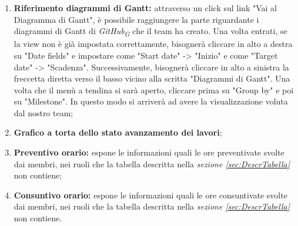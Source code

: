\begin{enumerate}
    \item \textbf{Riferimento diagrammi di Gantt:} attraverso un click sul link "Vai al Diagramma di Gantt", è possibile raggiungere la parte riguardante i diagrammi di Gantt di \textit{GitHub}\textsubscript{\textit{G}} che il team ha creato. Una volta entrati, se la view non è già impostata correttamente, bisognerà cliccare in alto a destra su "Date fields" e impostare come "Start date" -> "Inizio" e come "Target date" -> "Scadenza". Successivamente, bisognerà cliccare in alto a sinistra la freccetta diretta verso il basso vicino alla scritta "Diagrammi di Gantt". Una volta che il menù a tendina si sarà aperto, cliccare prima su "Group by" e poi su "Milestone". In questo modo si arriverà ad avere la visualizzazione voluta dal nostro team;
    \item \textbf{Grafico a torta dello stato avanzamento dei lavori};
    \item \textbf{Preventivo orario:} espone le informazioni quali le ore preventivate svolte dai membri, nei ruoli che la tabella descritta nella \textit{sezione \ref{sec:DescrTabella}} non contiene; 
    \item \textbf{Consuntivo orario:} espone le informazioni quali le ore consuntivate svolte dai membri, nei ruoli che la tabella descritta nella \textit{sezione \ref{sec:DescrTabella}} non contiene. 
\end{enumerate}
